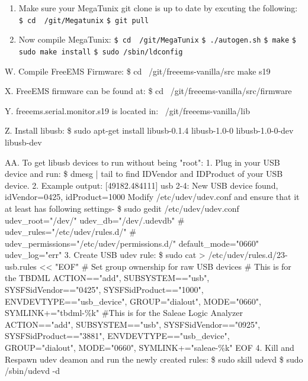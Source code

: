 \documentclass[12pt,notitlepage,onecolumn,oneside,openany,draft]{memoir}
\begin{document}
\begin{enumerate}
\item \textsf{Make sure your MegaTunix git clone is up to date by excuting the following:} \newline
      \texttt{\$ cd ~/git/Megatunix} \newline
      \texttt{\$ git pull}

\item \textsf{Now compile MegaTunix:} \newline
      \texttt{\$ cd ~/git/MegaTunix} \newline
      \texttt{\$ ./autogen.sh} \newline
      \texttt{\$ make} \newline
      \texttt{\$ sudo make install} \newline
      \texttt{\$ sudo /sbin/ldconfig} \newline
\end{enumerate}

W. Compile FreeEMS Firmware:
      \$ cd ~/git/freeems-vanilla/src
	make s19

X. FreeEMS firmware can be found at:
      \$ cd ~/git/freeems-vanilla/src/firmware

Y. freeems.serial.monitor.s19 is located in:
      ~/git/freeems-vanilla/lib

Z. Install libusb:
      \$ sudo apt-get install libusb-0.1.4 libusb-1.0-0 libusb-1.0-0-dev libusb-dev

AA. To get libusb devices to run without being "root":
1. Plug in your USB device and run:
\$ dmesg | tail
to find IDVendor and IDProduct of your USB device.
2. Example output:
[49182.484111] usb 2-4: New USB device found, idVendor=0425, idProduct=1000
Modify /etc/udev/udev.conf and ensure that it at least has following settings-
\$ sudo gedit /etc/udev/udev.conf		
udev_root="/dev/"
udev_db="/dev/.udevdb"
# udev_rules="/etc/udev/rules.d/"
# udev_permissions="/etc/udev/permissions.d/"
default_mode="0660"
udev_log="err"
3. Create USB udev rule:
\$ sudo cat > /etc/udev/rules.d/23-usb.rules << "EOF"
# Set group ownership for raw USB devices
# This is for the TBDML
ACTION=="add", SUBSYSTEM=="usb", SYSFS{idVendor}=="0425", SYSFS{idProduct}=="1000", ENV{DEVTYPE}=="usb_device", GROUP="dialout", MODE="0660", SYMLINK+="tbdml-\%k"
#This is for the Saleae Logic Analyzer 
ACTION=="add", SUBSYSTEM=="usb", SYSFS{idVendor}=="0925", SYSFS{idProduct}=="3881", ENV{DEVTYPE}=="usb_device", GROUP="dialout", MODE="0660", SYMLINK+="saleae-\%k"
EOF
4. Kill and Respawn udev deamon and run the newly created rules:
\$ sudo skill udevd
\$ sudo /sbin/udevd -d
\end{document}
